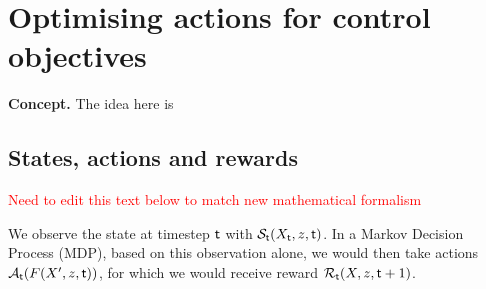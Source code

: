 \chapter{\sffamily Optimising actions for control objectives}

{\bfseries\sffamily Concept.} The idea here is 

\section{\sffamily States, actions and rewards}

\textcolor{red}{Need to edit this text below to match new mathematical formalism}

We observe the state at timestep ${\sf t}$ with ${\cal S}_{{\sf t}}(X_{{\sf t}}, z, {\sf t})$. In a Markov Decision Process (MDP), based on this observation alone, we would then take actions ${\cal A}_{{\sf t}}(F(X', z, {\sf t}))$, for which we would receive reward ${\cal R}_{{\sf t}}(X, z, {\sf t}+1)$.
